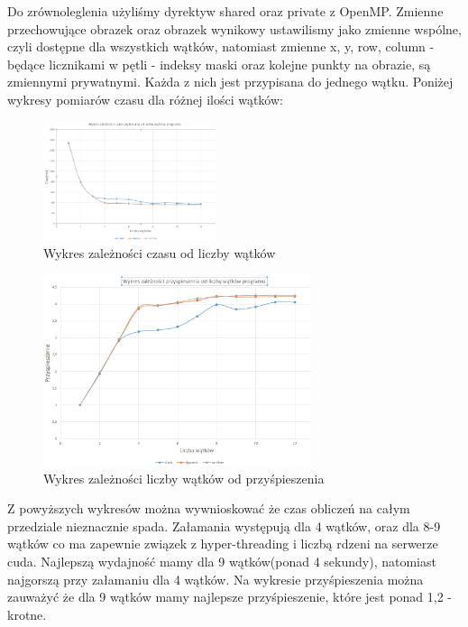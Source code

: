 \documentclass[a4paper,12pt]{article}
\begin{document}
Do zrównoleglenia użyliśmy dyrektyw shared oraz private z OpenMP. Zmienne przechowujące obrazek oraz obrazek wynikowy ustawilismy jako zmienne wspólne, czyli dostępne dla wszystkich wątków, natomiast zmienne x, y, row, column - będące licznikami w pętli - indeksy maski oraz kolejne punkty na obrazie, są zmiennymi prywatnymi. Każda z nich jest przypisana do jednego wątku. Poniżej wykresy pomiarów czasu dla różnej ilości wątków:


\begin{figure}
  \vspace{-20pt}
  \begin{center}
  \includegraphics[width=0.45\textwidth]{wykres.PNG}
  \end{center}
  \vspace{-20pt}
  \caption{Wykres zależności czasu od liczby wątków}
  \vspace{-10pt}
\end{figure}

\begin{figure}[!hbp]
  \centering
  \includegraphics[width=0.7\textwidth]{wykres1.PNG}
  \caption{Wykres zależności liczby wątków od przyśpieszenia}
\end{figure}

Z powyższych wykresów można wywnioskować że czas obliczeń na całym przedziale nieznacznie spada. Załamania występują dla 4 wątków, oraz dla 8-9 wątków co ma zapewnie związek z hyper-threading i liczbą rdzeni na serwerze cuda. Najlepszą wydajność mamy dla 9 wątków(ponad 4 sekundy), natomiast najgorszą przy załamaniu dla 4 wątków.
Na wykresie przyśpieszenia można zauważyć że dla 9 wątków mamy najlepsze przyśpieszenie, które jest ponad 1,2 - krotne.    
\end{document}
